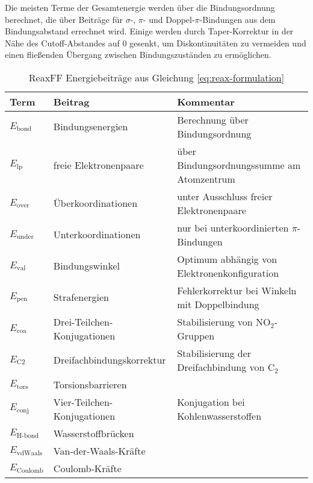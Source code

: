 Die meisten Terme der Gesamtenergie werden über die Bindungsordnung berechnet, die über Beiträge für $\sigma$-, $\pi$- und Doppel-$\pi$-Bindungen aus dem Bindungsabstand errechnet wird.
Einige werden durch Taper-Korrektur in der Nähe des Cutoff-Abstandes auf 0 gesenkt, um Diskontinuitäten zu vermeiden und einen fließenden Übergang zwischen Bindungszuständen zu ermöglichen.


\begin{table}
  \begin{tabularx}{\textwidth}{|llX|}
    \hline
    \textbf{Term}      & \textbf{Beitrag}            & \textbf{Kommentar}                            \\
    \hline
    $E_\text{bond}$    & Bindungsenergien            & Berechnung über Bindungsordnung               \\
    $E_\text{lp}$      & freie Elektronenpaare       & über Bindungsordnungssumme am Atomzentrum     \\
    $E_\text{over}$    & Überkoordinationen          & unter Ausschluss freier Elektronenpaare       \\
    $E_\text{under}$   & Unterkoordinationen         & nur bei unterkoordinierten $\pi$-Bindungen    \\
    $E_\text{val}$     & Bindungswinkel              & Optimum abhängig von Elektronenkonfiguration  \\
    $E_\text{pen}$     & Strafenergien               & Fehlerkorrektur bei Winkeln mit Doppelbindung \\
    $E_\text{coa}$     & Drei-Teilchen-Konjugationen & Stabilisierung von NO$_2$-Gruppen             \\
    $E_\text{C2}$      & Dreifachbindungskorrektur   & Stabilisierung der Dreifachbindung von C$_2$  \\
    $E_\text{tors}$    & Torsionsbarrieren           &                                               \\
    $E_\text{conj}$    & Vier-Teilchen-Konjugationen & Konjugation bei Kohlenwasserstoffen           \\
    $E_\text{H-bond}$  & Wasserstoffbrücken          &                                               \\
    $E_\text{vdWaals}$ & Van-der-Waals-Kräfte        &                                               \\
    $E_\text{Coulomb}$ & Coulomb-Kräfte              &                                               \\
    \hline
  \end{tabularx}
  \caption[ReaxFF Energiebeiträge]{ReaxFF Energiebeiträge aus Gleichung \ref{eq:reax-formulation}}
  \label{tab:reax-energies}
\end{table}

